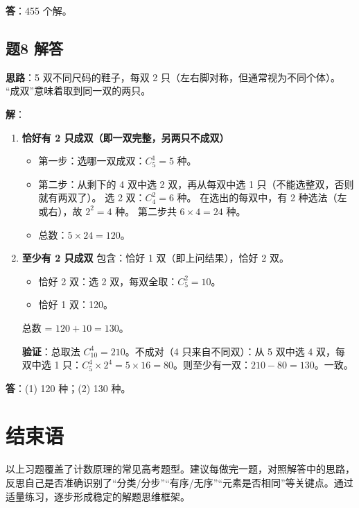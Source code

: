 \documentclass[10pt]{article}
\begin{document}
\textbf{答}：455 个解。

\subsection*{题8 解答}
\textbf{思路}：5 双不同尺码的鞋子，每双 2 只（左右脚对称，但通常视为不同个体）。 “成双”意味着取到同一双的两只。

\textbf{解}：
\begin{enumerate}
\item \textbf{恰好有 2 只成双（即一双完整，另两只不成双）}
  \begin{itemize}
  \item 第一步：选哪一双成双：\(C_5^1 = 5\) 种。
  \item 第二步：从剩下的 4 双中选 2 双，再从每双中选 1 只（不能选整双，否则就有两双了）。
    选 2 双：\(C_4^2 = 6\) 种。
    在选出的每双中，有 2 种选法（左或右），故 \(2^2 = 4\) 种。
    第二步共 \(6 \times 4 = 24\) 种。
  \item 总数：\(5 \times 24 = 120\)。
  \end{itemize}
\item \textbf{至少有 2 只成双}
  包含：恰好 1 双（即上问结果），恰好 2 双。
  \begin{itemize}
  \item 恰好 2 双：选 2 双，每双全取：\(C_5^2 = 10\)。
  \item 恰好 1 双：120。
  \end{itemize}
  总数 = \(120 + 10 = 130\)。

  \textbf{验证}：总取法 \(C_{10}^4 = 210\)。不成对（4 只来自不同双）：从 5 双中选 4 双，每双中选 1 只：\(C_5^4 \times 2^4 = 5 \times 16 = 80\)。则至少有一双：\(210 - 80 = 130\)。一致。
\end{enumerate}

\textbf{答}：(1) 120 种；(2) 130 种。

\section*{结束语}
以上习题覆盖了计数原理的常见高考题型。建议每做完一题，对照解答中的思路，反思自己是否准确识别了“分类/分步”“有序/无序”“元素是否相同”等关键点。通过适量练习，逐步形成稳定的解题思维框架。
\end{document}
